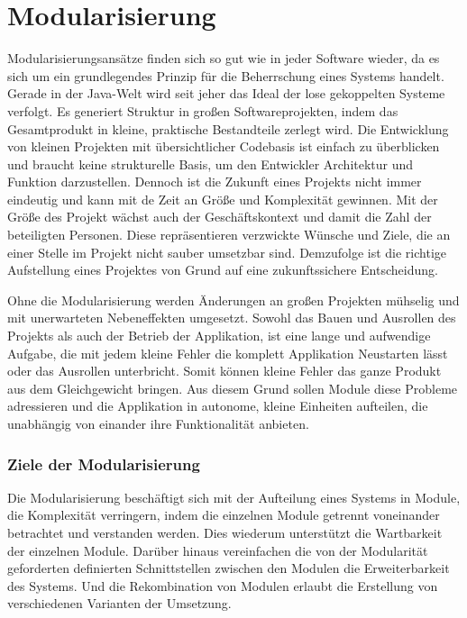 \chapter{Modularisierung}
  Modularisierungsansätze finden sich so gut wie in jeder Software wieder, da es sich um ein grundlegendes Prinzip für die Beherrschung eines Systems handelt. Gerade in der Java-Welt wird seit jeher das Ideal der lose gekoppelten Systeme verfolgt. 
  Es generiert  Struktur in großen Softwareprojekten, indem das Gesamtprodukt in kleine, praktische Bestandteile zerlegt wird. 
  Die Entwicklung von kleinen Projekten mit übersichtlicher Codebasis ist einfach zu überblicken und braucht keine strukturelle Basis, um den Entwickler Architektur und Funktion darzustellen. Dennoch ist die Zukunft eines Projekts nicht immer eindeutig und kann mit de Zeit an Größe und Komplexität gewinnen. Mit der Größe des Projekt wächst auch der Geschäftskontext und damit die Zahl der beteiligten Personen. Diese repräsentieren verzwickte Wünsche und Ziele, die an einer Stelle im Projekt nicht sauber umsetzbar sind.
  Demzufolge ist die richtige Aufstellung eines Projektes von Grund auf eine zukunftssichere Entscheidung. 
  
  Ohne die Modularisierung werden Änderungen an großen Projekten mühselig und mit unerwarteten Nebeneffekten umgesetzt. 
  Sowohl das Bauen und Ausrollen des Projekts als auch der Betrieb der Applikation, ist eine lange und aufwendige Aufgabe, die mit jedem kleine Fehler die komplett Applikation Neustarten lässt oder das Ausrollen unterbricht. 
  Somit können kleine Fehler das ganze Produkt aus dem Gleichgewicht bringen.
  Aus diesem Grund sollen Module diese Probleme adressieren und die Applikation in autonome, kleine Einheiten aufteilen, die unabhängig von einander ihre Funktionalität anbieten.

  \subsection{Ziele der Modularisierung}
    Die Modularisierung beschäftigt sich mit der Aufteilung eines Systems in Module, die Komplexität verringern, indem die einzelnen Module getrennt voneinander betrachtet und verstanden werden. Dies wiederum unterstützt die Wartbarkeit der einzelnen Module. Darüber hinaus vereinfachen die von der Modularität geforderten definierten Schnittstellen zwischen den Modulen die Erweiterbarkeit des Systems. Und die Rekombination von Modulen erlaubt die Erstellung von verschiedenen Varianten der Umsetzung. 
    

